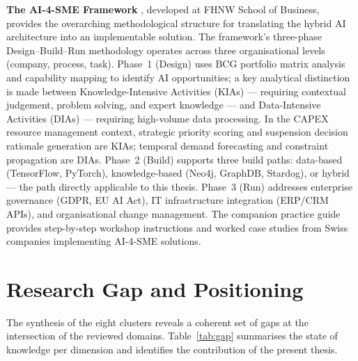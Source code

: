 \textbf{The AI-4-SME Framework} \parencite{peter2025ai4sme}, developed at FHNW School of
Business, provides the overarching methodological structure for translating the hybrid AI
architecture into an implementable solution. The framework's three-phase
Design--Build--Run methodology operates across three organisational levels (company,
process, task). Phase~1 (Design) uses BCG portfolio matrix analysis and capability mapping
to identify AI opportunities; a key analytical distinction is made between
Knowledge-Intensive Activities (KIAs) — requiring contextual judgement, problem solving, and
expert knowledge — and Data-Intensive Activities (DIAs) — requiring high-volume data
processing. In the CAPEX resource management context, strategic priority scoring and
suspension decision rationale generation are KIAs; temporal demand forecasting and constraint
propagation are DIAs. Phase~2 (Build) supports three build paths: data-based (TensorFlow,
PyTorch), knowledge-based (Neo4j, GraphDB, Stardog), or hybrid — the path directly
applicable to this thesis. Phase~3 (Run) addresses enterprise governance (GDPR, EU AI Act),
IT infrastructure integration (ERP/CRM APIs), and organisational change management. The
companion practice guide \parencite{fhnw2024kmu} provides step-by-step workshop instructions and
worked case studies from Swiss companies implementing AI-4-SME solutions.

\section{Research Gap and Positioning}
\label{sec:lit_gap}

The synthesis of the eight clusters reveals a coherent set of gaps at the intersection of the
reviewed domains. Table~\ref{tab:gap} summarises the state of knowledge per dimension and
identifies the contribution of the present thesis.

